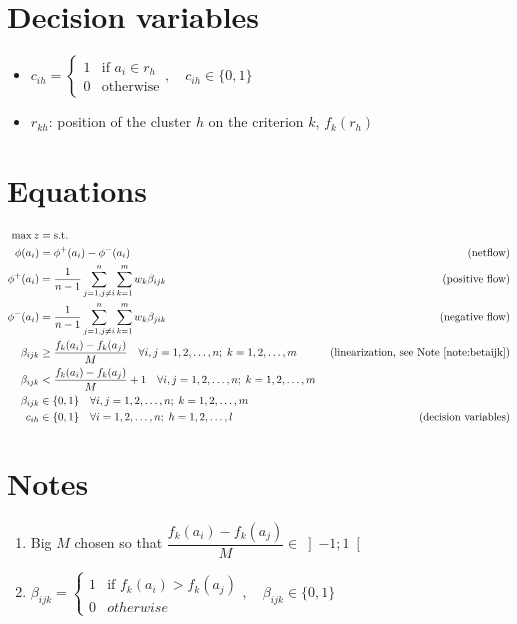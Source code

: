 \documentclass[a4paper]{article}
\begin{document}
    \section{Decision variables}
    \begin{itemize}
        \item $c_{ih} = \begin{cases}
            1 & \text{if } a_i \in r_h \\
            0 & \text{otherwise}
        \end{cases}, \quad c_{ih} \in \{0, 1\}$
        \item $r_{kh}$: position of the cluster $h$ on the criterion $k$, $f_k(r_h)$
    \end{itemize}
    \section{Equations}
    \begin{align}
    	\max z &=
        \text{s.t.} & \\
        \phi(a_i) &= \phi^+(a_i) - \phi^-(a_i) & \text{ (netflow)} \\
        \phi^+(a_i) &= \frac{1}{n-1} \sum_{j=1, j\neq i}^{n} \sum_{k=1}^{m} w_k \beta_{ijk} & \text{ (positive flow)} \\
        \phi^-(a_i) &= \frac{1}{n-1} \sum_{j=1, j\neq i}^{n} \sum_{k=1}^{m} w_k \beta_{jik} & \text{ (negative flow)} \\
        \beta_{ijk} &\geq \frac{f_k(a_i)-f_k(a_j)}{M} \quad \forall i,j = 1, 2, \dots, n;\; k = 1, 2, \dots, m & \text{ (linearization, see Note \ref{note:betaijk})} \\
        \beta_{ijk} &< \frac{f_k(a_i)-f_k(a_j)}{M} + 1 \quad \forall i,j = 1, 2, \dots, n;\; k = 1, 2, \dots, m \\
        \beta_{ijk} &\in \{0,1\} \quad \forall i,j = 1, 2, \dots, n;\; k = 1, 2, \dots, m \\
        c_{ih} &\in \{0, 1\} \quad \forall i = 1, 2, \dots, n;\; h = 1, 2, \dots, l & \text{ (decision variables)}
    \end{align}
    \section{Notes}
    \begin{enumerate}
        \item \label{note:bigm} Big $M$ chosen so that $\dfrac{f_k(a_i)-f_k(a_j)}{M} \in \left]-1;1\right[$
        \item \label{note:betaijk} $\beta_{ijk} = \begin{cases}
            1 & \text{if } f_k(a_i) > f_k(a_j) \\
            0 & otherwise
        \end{cases}, \quad \beta_{ijk} \in \{0, 1\}$
    \end{enumerate}
\end{document}
